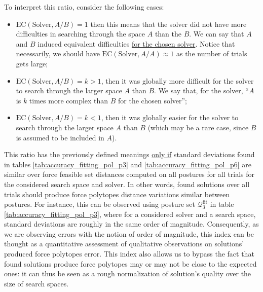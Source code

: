 To interpret this ratio, consider the following cases:
\begin{itemize}
    \item {$\text{EC}(\text{Solver}, A/B) = 1$ then this means that the solver did not have more difficulties in searching through the space $A$ than the $B$. We can say that $A$ and $B$ induced equivalent difficulties \underline{for the chosen solver}. Notice that necessarily, we should have $\text{EC}(\text{Solver}, A/A) \approx 1$ as the number of trials gets large;}
    \item {$\text{EC}(\text{Solver}, A/B) = k > 1$, then it was globally more difficult for the solver to search through the larger space $A$ than $B$. We say that, for the solver, ``$A$ is $k$ times more complex than $B$ for the chosen solver'';}
    \item {$\text{EC}(\text{Solver}, A/B) = k < 1$, then it was globally easier for the solver to search through the larger space $A$ than $B$ (which may be a rare case, since $B$ is assumed to be included in $A$).}
\end{itemize}

This ratio has the previously defined meanings \underline{only if} standard deviations found in tables \ref{tab:accuracy_fitting_pol_p3} and \ref{tab:accuracy_fitting_pol_p6} are similar over force feasible set distances computed on all postures for all trials for the considered search space and solver. In other words, found solutions over all trials should produce force polytopes distance variations similar between postures. For instance, this can be observed using posture set $\mathcal{Q}_3^{\text{fit}}$ in table \ref{tab:accuracy_fitting_pol_p3}, where for a considered solver and a search space, standard deviations are roughly in the same order of magnitude. Consequently, as we are observing errors with the notion of order of magnitude, this index can be thought as a quantitative assessment of qualitative observations on solutions' produced force polytopes error. This index also allows us to bypass the fact that found solutions produce force polytopes may or may not be close to the expected ones: it can thus be seen as a rough normalization of solution's quality over the size of search spaces. 

